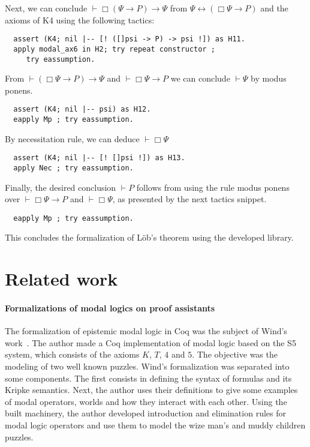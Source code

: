 \documentclass[sigconf,anonymous]{acmart}
\begin{document}
\noindent Next, we can conclude $\vdash \Box (\Psi \to P) \to \Psi$ from
$\Psi \leftrightarrow (\Box \Psi \to P)$ and the axioms of K4 using
the following tactics:

\begin{verbatim}
  assert (K4; nil |-- [! ([]psi -> P) -> psi !]) as H11.
  apply modal_ax6 in H2; try repeat constructor ;
     try eassumption.
\end{verbatim}

\noindent From $\vdash (\Box\Psi \to P) \to \Psi$ and $\vdash \Box \Psi \to P$
we can conclude $\vdash \Psi$ by modus ponens.

\begin{verbatim}
  assert (K4; nil |-- psi) as H12.
  eapply Mp ; try eassumption.
\end{verbatim}

\noindent By necessitation rule, we can deduce $\vdash \Box \Psi$

\begin{verbatim}
  assert (K4; nil |-- [! []psi !]) as H13.
  apply Nec ; try eassumption.
\end{verbatim}

\noindent Finally, the desired conclusion $\vdash P$ follows from
using the rule modus ponens over $\vdash \Box \Psi \to P$
and $\vdash \Box \Psi$, as presented by the next tactics
snippet.

\begin{verbatim}
  eapply Mp ; try eassumption.
\end{verbatim}

\noindent This concludes the formalization of L\"ob's theorem using
the developed library.

\section{Related work}\label{sec:related}

\paragraph{Formalizations of modal logics on proof assistants}

The formalization of epistemic modal logic in Coq was the subject of Wind's
work~\cite{dewind}.
The author made a Coq implementation of modal logic based on the S5 system,
which consists of  the axioms $K$, $T$, $4$ and $5$. The objective was the
modeling of two well known puzzles.
Wind's formalization was separated into some components. The first consists in
defining the syntax of formulas and its Kripke semantics. Next, the author uses
their definitions to give some examples of modal operators, worlds and how they
interact with each other. Using the built machinery, the author developed
introduction and elimination rules for modal logic operators and use them to
model the wize man's and muddy children puzzles.
\end{document}
